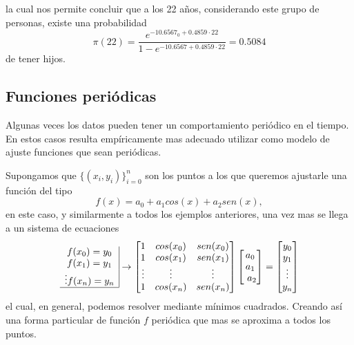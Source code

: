 \documentclass[letterpaper,11pt]{article}
\begin{document}
la cual nos permite concluir que a los 22 a\~{n}os, considerando este grupo de personas, existe una probabilidad 
$$
\pi(22)=\frac{e^{-10.6567_0+0.4859 \cdot 22}}{1-e^{-10.6567+0.4859 \cdot 22}}=0.5084 
$$
de tener hijos.

\subsection{Funciones peri\'odicas}
Algunas veces los datos pueden tener un comportamiento peri\'odico en el tiempo. En estos casos resulta emp\'iricamente mas adecuado utilizar como modelo de ajuste funciones que sean peri\'odicas.

Supongamos que $\{(x_i,y_i)\}_{i=0}^n$ son los puntos a los que queremos ajustarle una funci\'on del tipo
$$
f(x)=a_0+a_1cos(x)+a_2sen(x),
$$
en este caso, y similarmente a todos los ejemplos anteriores, una vez mas se llega a un sistema de ecuaciones
$$
\begin{array}{c|}
f(x_0) = y_0\\
f(x_1) = y_1\\
\vdots
f(x_n) = y_n\\
\hline
\end{array}
\rightarrow
\begin{bmatrix}
1 & cos(x_0) & sen(x_0)\\
1 & cos(x_1) & sen(x_1)\\
\vdots & \vdots & \vdots\\
1 & cos(x_n) & sen(x_n)\\
\end{bmatrix}
\begin{bmatrix}
a_0\\ a_1\\\ a_2
\end{bmatrix}
=
\begin{bmatrix}
y_0\\y_1\\\vdots \\y_n
\end{bmatrix}
$$
el cual, en general, podemos resolver mediante m\'inimos cuadrados. Creando as\'i una forma particular de funci\'on $f$ peri\'odica que mas se aproxima a todos los puntos.
\end{document}
